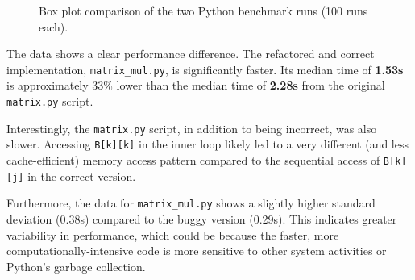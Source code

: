 \documentclass[a4paper]{article}
\begin{document}
\begin{figure}[h!]
    \centering
    \caption{Box plot comparison of the two Python benchmark runs (100 runs each).}
    \label{fig:python_benchmark_comparison}
\end{figure}

\clearpage %

The data shows a clear performance difference. The refactored and correct implementation, \texttt{matrix\_mul.py}, is significantly faster. Its median time of \textbf{1.53s} is approximately 33\% lower than the median time of \textbf{2.28s} from the original \texttt{matrix.py} script.

Interestingly, the \texttt{matrix.py} script, in addition to being incorrect, was also slower. Accessing \texttt{B[k][k]} in the inner loop likely led to a very different (and less cache-efficient) memory access pattern compared to the sequential access of \texttt{B[k][j]} in the correct version.

Furthermore, the data for \texttt{matrix\_mul.py} shows a slightly higher standard deviation (0.38s) compared to the buggy version (0.29s). This indicates greater variability in performance, which could be because the faster, more computationally-intensive code is more sensitive to other system activities or Python's garbage collection.
\end{document}
